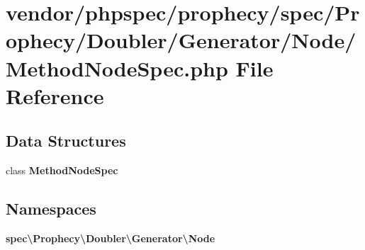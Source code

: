 \section{vendor/phpspec/prophecy/spec/\+Prophecy/\+Doubler/\+Generator/\+Node/\+Method\+Node\+Spec.php File Reference}
\label{_method_node_spec_8php}
\subsection*{Data Structures}
\begin{DoxyCompactItemize}
\item 
class {\bf Method\+Node\+Spec}
\end{DoxyCompactItemize}
\subsection*{Namespaces}
\begin{DoxyCompactItemize}
\item 
 {\bf spec\textbackslash{}\+Prophecy\textbackslash{}\+Doubler\textbackslash{}\+Generator\textbackslash{}\+Node}
\end{DoxyCompactItemize}
